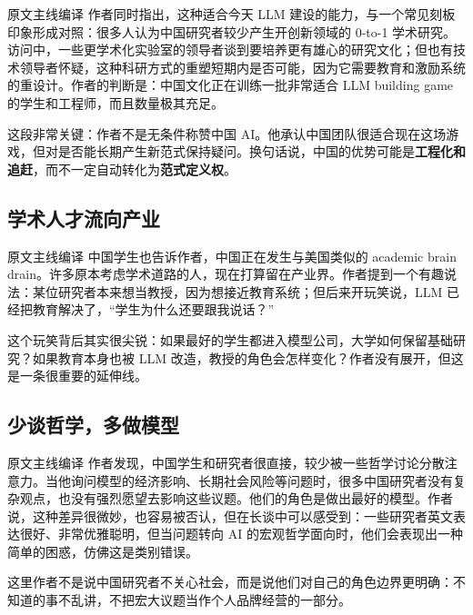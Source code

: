 \documentclass[a4paper]{article}
\begin{document}
\begin{translationbox}{原文主线编译}
作者同时指出，这种适合今天 LLM 建设的能力，与一个常见刻板印象形成对照：很多人认为中国研究者较少产生开创新领域的 0-to-1 学术研究。访问中，一些更学术化实验室的领导者谈到要培养更有雄心的研究文化；但也有技术领导者怀疑，这种科研方式的重塑短期内是否可能，因为它需要教育和激励系统的重设计。作者的判断是：中国文化正在训练一批非常适合 LLM building game 的学生和工程师，而且数量极其充足。
\end{translationbox}

这段非常关键：作者不是无条件称赞中国 AI。他承认中国团队很适合现在这场游戏，但对是否能长期产生新范式保持疑问。换句话说，中国的优势可能是\textbf{工程化和追赶}，而不一定自动转化为\textbf{范式定义权}。

\subsection{学术人才流向产业}

\begin{translationbox}{原文主线编译}
中国学生也告诉作者，中国正在发生与美国类似的 academic brain drain。许多原本考虑学术道路的人，现在打算留在产业界。作者提到一个有趣说法：某位研究者本来想当教授，因为想接近教育系统；但后来开玩笑说，LLM 已经把教育解决了，``学生为什么还要跟我说话？''
\end{translationbox}

这个玩笑背后其实很尖锐：如果最好的学生都进入模型公司，大学如何保留基础研究？如果教育本身也被 LLM 改造，教授的角色会怎样变化？作者没有展开，但这是一条很重要的延伸线。

\subsection{少谈哲学，多做模型}

\begin{translationbox}{原文主线编译}
作者发现，中国学生和研究者很直接，较少被一些哲学讨论分散注意力。当他询问模型的经济影响、长期社会风险等问题时，很多中国研究者没有复杂观点，也没有强烈愿望去影响这些议题。他们的角色是做出最好的模型。作者说，这种差异很微妙，也容易被否认，但在长谈中可以感受到：一些研究者英文表达很好、非常优雅聪明，但当问题转向 AI 的宏观哲学面向时，他们会表现出一种简单的困惑，仿佛这是类别错误。
\end{translationbox}

这里作者不是说中国研究者不关心社会，而是说他们对自己的角色边界更明确：不知道的事不乱讲，不把宏大议题当作个人品牌经营的一部分。
\end{document}
